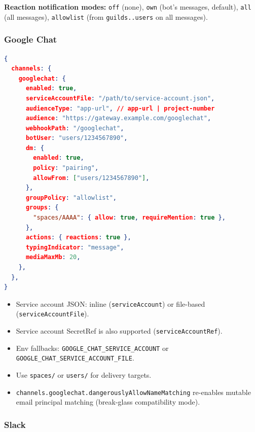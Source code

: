 \textbf{Reaction notification modes:} \texttt{off} (none), \texttt{own} (bot's messages, default), \texttt{all} (all messages), \texttt{allowlist} (from \texttt{guilds..users} on all messages).

\subsubsection{Google Chat}


\begin{lstlisting}[language=json]
{
  channels: {
    googlechat: {
      enabled: true,
      serviceAccountFile: "/path/to/service-account.json",
      audienceType: "app-url", // app-url | project-number
      audience: "https://gateway.example.com/googlechat",
      webhookPath: "/googlechat",
      botUser: "users/1234567890",
      dm: {
        enabled: true,
        policy: "pairing",
        allowFrom: ["users/1234567890"],
      },
      groupPolicy: "allowlist",
      groups: {
        "spaces/AAAA": { allow: true, requireMention: true },
      },
      actions: { reactions: true },
      typingIndicator: "message",
      mediaMaxMb: 20,
    },
  },
}
\end{lstlisting}


\begin{itemize}
  \item Service account JSON: inline (\texttt{serviceAccount}) or file-based (\texttt{serviceAccountFile}).
  \item Service account SecretRef is also supported (\texttt{serviceAccountRef}).
  \item Env fallbacks: \texttt{GOOGLE\_CHAT\_SERVICE\_ACCOUNT} or \texttt{GOOGLE\_CHAT\_SERVICE\_ACCOUNT\_FILE}.
  \item Use \texttt{spaces/} or \texttt{users/} for delivery targets.
  \item \texttt{channels.googlechat.dangerouslyAllowNameMatching} re-enables mutable email principal matching (break-glass compatibility mode).
\end{itemize}


\subsubsection{Slack}


